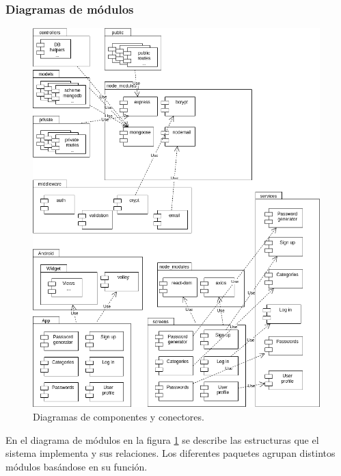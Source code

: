 \documentclass{article}
\begin{document}
\subsubsection*{Diagramas de módulos}

\begin{figure}[H]
    \centering
        \includegraphics[width=0.99\textwidth]{../images/modulos_v1.png}
    \caption{Diagramas de componentes y conectores.}
    \label{modulos}
\end{figure}
\pagebreak

En el diagrama de módulos en la figura \ref{modulos} se describe las estructuras que el sistema implementa y sus relaciones. Los diferentes paquetes agrupan distintos módulos basándose en su función.
\end{document}
